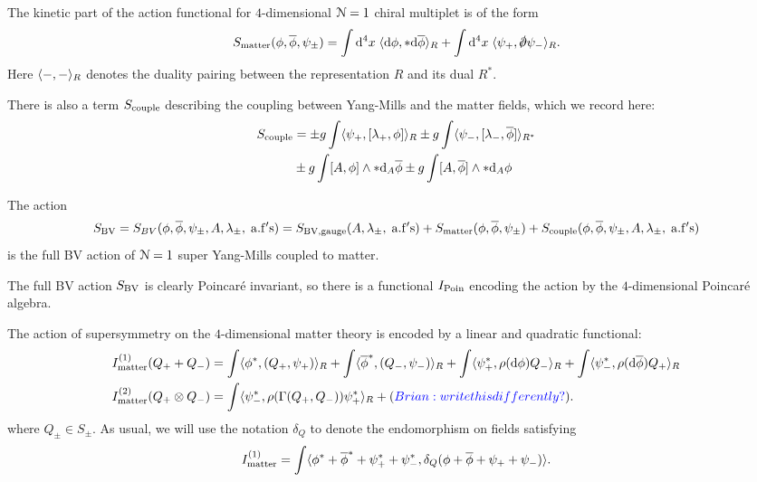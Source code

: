 \documentclass[10pt, oneside]{article}
\begin{document}
The kinetic part of the action functional for $4$-dimensional $\mc N = 1$ chiral multiplet is of the form
\[
S_{\rm matter} (\phi, \Bar{\phi}, \psi_{\pm}) = \int \d^4 x \; \<\d \phi , * \d \Bar{\phi}\>_R + \int \d^4 x \; \<\psi_+ , \sd \dd \psi_-\>_R .
\]
Here $\<-,-\>_R$ denotes the duality pairing between the representation $R$ and its dual $R^*$. 

There is also a term $S_{\rm couple}$ describing the coupling between Yang-Mills and the matter fields, which we record here:
\begin{align*}
S_{\rm couple} & = \pm g \int \<\psi_+, [\lambda_+, \phi]\>_R \pm g \int \<\psi_-, [\lambda_-, \Bar{\phi}]\>_{R^*} \\
& \pm g \int [A, \phi] \wedge * \d_{A} \Bar{\phi} \pm g \int [A, \Bar{\phi}] \wedge * \d_A \phi
\end{align*}

The action
\[
S_{\rm BV} = S_{BV}(\phi, \Bar{\phi}, \psi_\pm , A, \lambda_\pm, \; {\rm a.f's}) = S_{\rm BV, gauge}(A, \lambda_\pm, \; {\rm a.f's}) + S_{\rm matter}(\phi, \Bar{\phi}, \psi_\pm) + S_{\rm couple} (\phi, \Bar{\phi}, \psi_\pm , A, \lambda_\pm, \; {\rm a.f's}) 
\]
is the full BV action of $\mc N = 1$ super Yang-Mills coupled to matter.

The full BV action $S_{\rm BV}$ is clearly Poincar\'{e} invariant, so there is a functional $I_{\rm Poin}$ encoding the action by the $4$-dimensional Poincar\'{e} algebra.

The action of supersymmetry on the $4$-dimensional matter theory is encoded by a linear and quadratic functional:
\begin{align*}
I^{(1)}_{\rm matter} (Q_+ + Q_-) & = \int \<\phi^*, (Q_+, \psi_+)\>_R + \int \<\Bar{\phi}^*, (Q_-, \psi_-)\>_R + \int \<\psi^*_+, \rho(\d \phi) Q_- \>_R + \int \<\psi_-^*, \rho(\d \Bar{\phi}) Q_+\>_R \\
I^{(2)}_{\rm matter} (Q_+ \otimes Q_-) & = \int \<\psi^*_- , \rho(\Gamma(Q_+, Q_-)) \psi_+^*\>_R + \brian{write this differently?}.
\end{align*}
where $Q_\pm \in S_{\pm}$. 
As usual, we will use the notation $\delta_Q$ to denote the endomorphism on fields satisfying
\[
I^{(1)}_{\rm matter} = \int \<\phi^* + \Bar{\phi}^* + \psi^*_+ + \psi_-^*, \delta_Q(\phi + \Bar{\phi} + \psi_+ + \psi_-) \> .
\]
\end{document}
